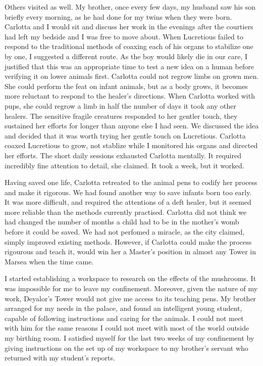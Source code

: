 \documentclass{article}
\begin{document}
Others visited as well. My brother, once every few days, my husband saw his son briefly every morning, as he had done for my twins when they were born. Carlotta and I would sit and discuss her work in the evenings after the courtiers had left my bedside and I was free to move about. When Lucretious failed to respond to the traditional methods of coaxing each of his organs to stabilize one by one, I suggested a different route. As the boy would likely die in our care, I justified that this was an appropriate time to test a new idea on a human before verifying it on lower animals first. Carlotta could not regrow limbs on grown men. She could perform the feat on infant animals, but as a body grows, it becomes more reluctant to respond to the healer's directions. When Carlotta worked with pups, she could regrow a limb in half the number of days it took any other healers. The sensitive fragile creatures responded to her gentler touch, they sustained her efforts for longer than anyone else I had seen. We discussed the idea and decided that it was worth trying her gentle touch on Lucretious. Carlotta coaxed Lucretious to grow, not stablize while I monitored his organs and directed her efforts. The short daily sessions exhausted Carlotta mentally. It required incredibly fine attention to detail, she claimed. It took a week, but it worked. 

Having saved one life, Carlotta retreated to the animal pens to codify her process and make it rigorous. We had found another way to save infants born too early. It was more difficult, and required  the attentions of a deft healer, but it seemed more reliable than the methods currently practised. Carlotta did not think we had changed the number of months a child had to be in the mother's womb before it could be saved. We had not perfomed a miracle, as the city claimed, simply improved existing methods. However, if Carlotta could make the process rigourous and teach it, would win her a Master's position in almost any Tower in Marsea when the time came.

I started establishing a workspace to research on the effects of the mushrooms. It was impossible for me to leave my confinement. Moreover, given the nature of my work, Deyalor's Tower would not give me access to its teaching pens. My brother arranged for my needs in the palace, and found an intelligent young student, capable of following instructions and caring for the animals. I could not meet with him for the same reasons I could not meet with most of the world outside my birthing room. I satisfied myself for the last two weeks of my confinement by giving instructions on the set up of my workspace to my brother's servant who returned with my student's reports.
\end{document}
